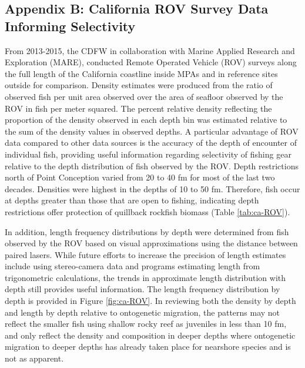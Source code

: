 \documentclass[11pt,
  english,
  a4paper,
]{article}
\begin{document}
\hypertarget{append_b}{%
\subsection{Appendix B: California ROV Survey Data Informing Selectivity}\label{append_b}}

\leavevmode\tagmcend\tagstructend


From 2013-2015, the CDFW in collaboration with Marine Applied Research and Exploration (MARE), conducted Remote Operated Vehicle (ROV) surveys along the full length of the California coastline inside MPAs and in reference sites outside for comparison. Density estimates were produced from the ratio of observed fish per unit area observed over the area of seafloor observed by the ROV in fish per meter squared. The percent relative density reflecting the proportion of the density observed in each depth bin was estimated relative to the sum of the density values in observed depths. A particular advantage of ROV data compared to other data sources is the accuracy of the depth of encounter of individual fish, providing useful information regarding selectivity of fishing gear relative to the depth distribution of fish observed by the ROV. Depth restrictions north of Point Conception varied from 20 to 40 fm for most of the last two decades. Densities were highest in the depths of 10 to 50 fm. Therefore, fish occur at depths greater than those that are open to fishing, indicating depth restrictions offer protection of quillback rockfish biomass (Table \ref{tab:ca-ROV}).

\leavevmode\tagmcend\tagstructend\par


In addition, length frequency distributions by depth were determined from fish observed by the ROV based on visual approximations using the distance between paired lasers. While future efforts to increase the precision of length estimates include using stereo-camera data and programs estimating length from trigonometric calculations, the trends in approximate length distribution with depth still provides useful information. The length frequency distribution by depth is provided in Figure \ref{fig:ca-ROV}. In reviewing both the density by depth and length by depth relative to ontogenetic migration, the patterns may not reflect the smaller fish using shallow rocky reef as juveniles in less than 10 fm, and only reflect the density and composition in deeper depths where ontogenetic migration to deeper depths has already taken place for nearshore species and is not as apparent.
\end{document}
